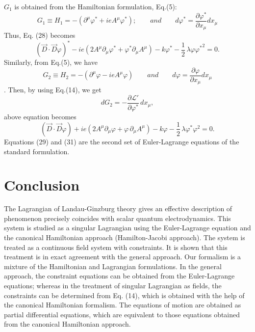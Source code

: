 \documentclass[12pt]{article}
\begin{document}
$G_{1}$ is obtained from the Hamiltonian formulation, Eq.(5):
$$G_{1}\equiv H_{1}=-(\partial^\mu{\varphi}^{\ast}+ieA^{\mu}\varphi^{\ast});\qquad and \qquad d\varphi^{\ast}=\frac{\partial\varphi^{\ast}}{\partial x_\mu} dx_\mu$$
Thus, Eq. (28) becomes
\begin{equation}\label{29}
(\overrightarrow{D}\cdot\overrightarrow{D}\varphi)^{\ast}-ie(2A^{\mu}\partial_{\mu}\varphi^{\ast}+\varphi^{\ast}\partial_{\mu}A^{\mu})-k\varphi^{\ast}-\frac{1}{2}\,\lambda\varphi{\varphi^{\ast}}^2=0.
\end{equation}
Similarly, from Eq.(5), we have $$G_{2}\equiv
H_{2}=-(\partial^\mu{\varphi}-ieA^{\mu}\varphi)\qquad and \qquad
d\varphi=\frac{\partial\varphi}{\partial x_\mu} dx_\mu$$. Then, by
using Eq.(14), we get
\begin{equation}\label{30}
dG_{2}=-\frac{\partial \mathcal{L'}}{\partial
\varphi^{\ast}}\,dx_{\mu},
\end{equation}
above equation becomes
\begin{equation}\label{31}
(\overrightarrow{D}\cdot\overrightarrow{D}\varphi)+ie(2A^{\mu}\partial_{\mu}\varphi+\varphi\,\partial_{\mu}A^{\mu})-k\varphi-\frac{1}{2}\,\lambda\varphi^{\ast}{\varphi}^2=0.
\end{equation}
Equations (29) and (31) are the second set of Euler-Lagrange
equations of the standard formulation.

\section {Conclusion}
\indent The Lagrangian of Landau-Ginzburg theory gives an
effective description of phenomenon precisely coincides with
scalar quantum electrodynamics. This system is studied as a singular Lagrangian
using the Euler-Lagrange equation and the canonical Hamiltonian approach (Hamilton-Jacobi approach). The system is treated as a
continuous field system with constraints. It is shown that this
treatment is in exact agreement with the general approach. Our
formalism is a mixture of the Hamiltonian and Lagrangian
formulations. In the general approach, the constraint equations
can be obtained from the Euler-Lagrange equations; whereas in the
treatment of singular Lagrangian as fields, the constraints can be
determined from Eq. (14), which is obtained with the help of the
canonical Hamiltonian formalism. The equations of motion are obtained as
partial differential equations, which are equivalent to those
equations obtained from the canonical Hamiltonian approach.
\end{document}
